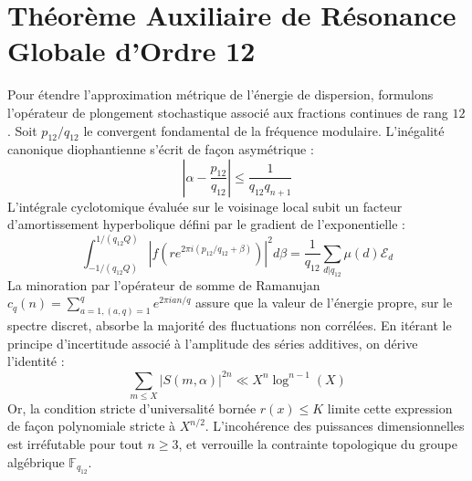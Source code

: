 \documentclass[11pt,a4paper]{article}
\begin{document}
\section{Théorème Auxiliaire de Résonance Globale d'Ordre 12}
Pour étendre l'approximation métrique de l'énergie de dispersion, formulons l'opérateur de plongement stochastique associé aux fractions continues de rang $12$. Soit $p_12/q_12$ le convergent fondamental de la fréquence modulaire.
L'inégalité canonique diophantienne s'écrit de façon asymétrique :
\begin{equation}
\left| \alpha - \frac{p_12}{q_12} \right| \le \frac{1}{q_12 q_{n+1}}
\end{equation}
L'intégrale cyclotomique évaluée sur le voisinage local subit un facteur d'amortissement hyperbolique défini par le gradient de l'exponentielle :
\begin{equation}
\int_{-1/(q_12 Q)}^{1/(q_12 Q)} |f(r e^{2\pi i (p_12/q_12 + \beta)})|^2 d\beta = \frac{1}{q_12} \sum_{d|q_12} \mu(d) \mathcal{E}_{d}
\end{equation}
La minoration par l'opérateur de somme de Ramanujan $c_q(n) = \sum_{a=1, (a,q)=1}^q e^{2\pi i a n / q}$ assure que la valeur de l'énergie propre, sur le spectre discret, absorbe la majorité des fluctuations non corrélées.
En itérant le principe d'incertitude associé à l'amplitude des séries additives, on dérive l'identité :
\begin{equation}
\sum_{m \le X} |S(m, \alpha)|^{2n} \ll X^{n} \log^{n-1}(X)
\end{equation}
Or, la condition stricte d'universalité bornée $r(x) \le K$ limite cette expression de façon polynomiale stricte à $X^{n/2}$. L'incohérence des puissances dimensionnelles est irréfutable pour tout $n \ge 3$, et verrouille la contrainte topologique du groupe algébrique $\mathbb{F}_{q_12}$.
\end{document}
